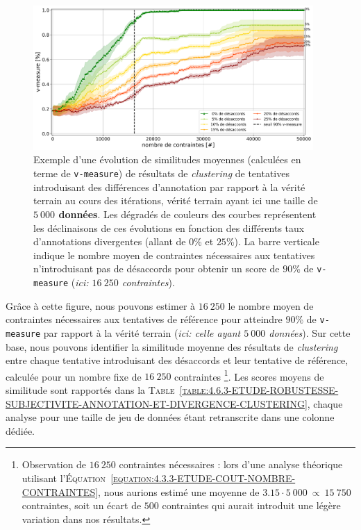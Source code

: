 			\begin{figure}[!htb]
				\centering
				\includegraphics[width=0.95\textwidth]{figures/etude-robustesse-subjectivite-et-difference-5000}
				\caption{
					Exemple d'une évolution de similitudes moyennes (calculées en terme de \texttt{v-measure}) de résultats de \textit{clustering} de tentatives introduisant des différences d'annotation par rapport à la vérité terrain au cours des itérations, vérité terrain ayant ici une taille de \textbf{$5~000$ données}.
					Les dégradés de couleurs des courbes représentent les déclinaisons de ces évolutions en fonction des différents taux d'annotations divergentes (allant de $0$\% et $25$\%).
					La barre verticale indique le nombre moyen de contraintes nécessaires aux tentatives n'introduisant pas de désaccords pour obtenir un score de $90$\% de \texttt{v-measure} (\textit{ici: $16~250$ contraintes}).
				}
				\label{figure:4.6.3-ETUDE-ROBUSTESSE-SUBJECTIVITE-ANNOTATION-ET-DIVERGENCE-5000}
			\end{figure}
			
			Grâce à cette figure, nous pouvons estimer à $16~250$ le nombre moyen de contraintes nécessaires aux tentatives de référence pour atteindre $90$\% de \texttt{v-measure} par rapport à la vérité terrain (\textit{ici: celle ayant $5~000$ données}).
			Sur cette base, nous pouvons identifier la similitude moyenne des résultats de \textit{clustering} entre chaque tentative introduisant des désaccords et leur tentative de référence, calculée pour un nombre fixe de $16~250$ contraintes \footnote{
				Observation de $16~250$ contraintes nécessaires : lors d'une analyse théorique utilisant l'\textsc{Équation~\ref{equation:4.3.3-ETUDE-COUT-NOMBRE-CONTRAINTES}}, nous aurions estimé une moyenne de $3.15 \cdot 5~000~\propto~15~750$ contraintes, soit un écart de $500$ contraintes qui aurait introduit une légère variation dans nos résultats.
			}.
			Les scores moyens de similitude sont rapportés dans la \textsc{Table~\ref{table:4.6.3-ETUDE-ROBUSTESSE-SUBJECTIVITE-ANNOTATION-ET-DIVERGENCE-CLUSTERING}}, chaque analyse pour une taille de jeu de données étant retranscrite dans une colonne dédiée.
			
